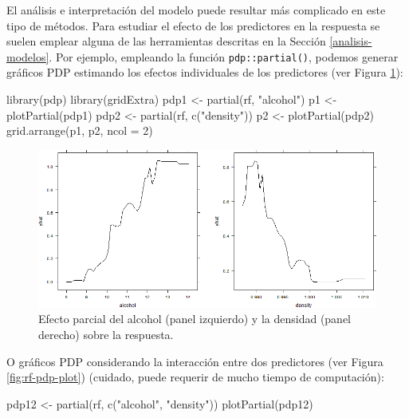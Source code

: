 \documentclass[
]{book}
\newenvironment{Shaded}{\begin{snugshade}}{\end{snugshade}}
\newcommand{\AttributeTok}[1]{\textcolor[rgb]{0.77,0.63,0.00}{#1}}
\newcommand{\DecValTok}[1]{\textcolor[rgb]{0.00,0.00,0.81}{#1}}
\newcommand{\FunctionTok}[1]{\textcolor[rgb]{0.00,0.00,0.00}{#1}}
\newcommand{\NormalTok}[1]{#1}
\newcommand{\OtherTok}[1]{\textcolor[rgb]{0.56,0.35,0.01}{#1}}
\newcommand{\StringTok}[1]{\textcolor[rgb]{0.31,0.60,0.02}{#1}}
\theoremstyle{break}
\theoremstyle{nonumberplain}
\begin{document}
El análisis e interpretación del modelo puede resultar más complicado en este tipo de métodos.
Para estudiar el efecto de los predictores en la respuesta se suelen emplear alguna de las herramientas descritas en la Sección \ref{analisis-modelos}.
Por ejemplo, empleando la función \texttt{pdp::partial()}, podemos generar gráficos PDP estimando los efectos individuales de los predictores (ver Figura \ref{fig:rf-pdp-uni-plot}):

\begin{Shaded}
\begin{Highlighting}[]
\FunctionTok{library}\NormalTok{(pdp)}
\FunctionTok{library}\NormalTok{(gridExtra)}
\NormalTok{pdp1 }\OtherTok{\textless{}{-}} \FunctionTok{partial}\NormalTok{(rf, }\StringTok{"alcohol"}\NormalTok{)}
\NormalTok{p1 }\OtherTok{\textless{}{-}} \FunctionTok{plotPartial}\NormalTok{(pdp1)}
\NormalTok{pdp2 }\OtherTok{\textless{}{-}} \FunctionTok{partial}\NormalTok{(rf, }\FunctionTok{c}\NormalTok{(}\StringTok{"density"}\NormalTok{))}
\NormalTok{p2 }\OtherTok{\textless{}{-}} \FunctionTok{plotPartial}\NormalTok{(pdp2)}
\FunctionTok{grid.arrange}\NormalTok{(p1, p2, }\AttributeTok{ncol =} \DecValTok{2}\NormalTok{)}
\end{Highlighting}
\end{Shaded}

\begin{figure}[!htb]

{\centering \includegraphics[width=0.9\linewidth]{images/rf-pdp-uni-1} 

}

\caption{Efecto parcial del alcohol (panel izquierdo) y la densidad (panel derecho) sobre la respuesta.}\label{fig:rf-pdp-uni-plot}
\end{figure}

O gráficos PDP considerando la interacción entre dos predictores (ver Figura \ref{fig:rf-pdp-plot}) (cuidado, puede requerir de mucho tiempo de computación):

\begin{Shaded}
\begin{Highlighting}[]
\NormalTok{pdp12 }\OtherTok{\textless{}{-}} \FunctionTok{partial}\NormalTok{(rf, }\FunctionTok{c}\NormalTok{(}\StringTok{"alcohol"}\NormalTok{, }\StringTok{"density"}\NormalTok{))}
\FunctionTok{plotPartial}\NormalTok{(pdp12)}
\end{Highlighting}
\end{Shaded}
\end{document}
